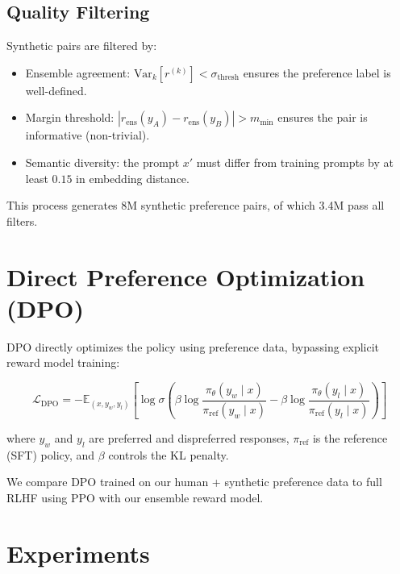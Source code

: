 \documentclass[11pt,a4paper]{article}
\begin{document}
\subsection{Quality Filtering}

Synthetic pairs are filtered by:
\begin{itemize}
    \item Ensemble agreement: $\text{Var}_k[r^{(k)}] < \sigma_{\text{thresh}}$ ensures
          the preference label is well-defined.
    \item Margin threshold: $|r_{\text{ens}}(y_A) - r_{\text{ens}}(y_B)| > m_{\min}$
          ensures the pair is informative (non-trivial).
    \item Semantic diversity: the prompt $x'$ must differ from training prompts by
          at least $0.15$ in embedding distance.
\end{itemize}

This process generates 8M synthetic preference pairs, of which 3.4M pass all filters.

\section{Direct Preference Optimization (DPO)}
\label{sec:dpo}

DPO \cite{rafailov2023direct} directly optimizes the policy using preference data,
bypassing explicit reward model training:

\begin{equation}
    \mathcal{L}_{\text{DPO}} = -\mathbb{E}_{(x, y_w, y_l)}\!\left[
    \log \sigma\!\left(\beta \log \frac{\pi_\theta(y_w \mid x)}{\pi_{\text{ref}}(y_w \mid x)}
    - \beta \log \frac{\pi_\theta(y_l \mid x)}{\pi_{\text{ref}}(y_l \mid x)}\right)
    \right]
    \label{eq:dpo}
\end{equation}

where $y_w$ and $y_l$ are preferred and dispreferred responses, $\pi_{\text{ref}}$
is the reference (SFT) policy, and $\beta$ controls the KL penalty.

We compare DPO trained on our human + synthetic preference data to full RLHF using
PPO with our ensemble reward model.

\section{Experiments}
\label{sec:experiments}
\end{document}

